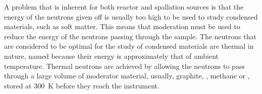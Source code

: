 A problem that is inherent for both reactor and spallation sources is that the energy of the neutrons given off is usually too high to be used to study condensed materials, such as soft matter.
This means that moderation must be used to reduce the energy of the neutrons passing through the sample.
The neutrons that are considered to be optimal for the study of condensed materials are thermal in nature, named because their energy is approximately that of ambient temperature.
Thermal neutrons are achieved by allowing the neutrons to pass through a large volume of moderator material, usually, graphite, , methane or , stored at \SI{300}{\kelvin} before they reach the instrument.\autocite{sivia_elementary_2011}
